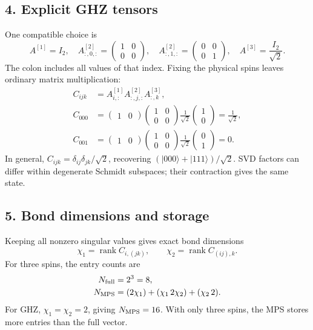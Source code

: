 \documentclass[11pt]{article}
\newcommand{\ket}[1]{\lvert #1\rangle}
\newcommand{\mtwo}[4]{\begin{pmatrix}#1&#2\\#3&#4\end{pmatrix}}
\begin{document}
\subsection*{4. Explicit GHZ tensors}
One compatible choice is
\begin{equation}
A^{[1]}=I_2,\quad
A^{[2]}_{:,0,:}=\mtwo{1}{0}{0}{0},\quad
A^{[2]}_{:,1,:}=\mtwo{0}{0}{0}{1},\quad
A^{[3]}=\frac{I_2}{\sqrt2}.
\end{equation}
The colon includes all values of that index. Fixing the physical spins leaves ordinary matrix multiplication:
\begin{align}
C_{ijk}&=A^{[1]}_{i,:}A^{[2]}_{:,j,:}A^{[3]}_{:,k},\\
C_{000}&=\begin{pmatrix}1&0\end{pmatrix}\mtwo{1}{0}{0}{0}
\frac1{\sqrt2}\begin{pmatrix}1\\0\end{pmatrix}=\frac1{\sqrt2},\\
C_{001}&=\begin{pmatrix}1&0\end{pmatrix}\mtwo{1}{0}{0}{0}
\frac1{\sqrt2}\begin{pmatrix}0\\1\end{pmatrix}=0.
\end{align}
In general, $C_{ijk}=\delta_{ij}\delta_{jk}/\sqrt2$, recovering $(\ket{000}+\ket{111})/\sqrt2$. SVD factors can differ within degenerate Schmidt subspaces; their contraction gives the same state.

\newpage
\subsection*{5. Bond dimensions and storage}
Keeping all nonzero singular values gives exact bond dimensions
\begin{equation}
\chi_1=\operatorname{rank}C_{i,(jk)},\qquad
\chi_2=\operatorname{rank}C_{(ij),k}.
\end{equation}
For three spins, the entry counts are
\begin{align}
N_{\rm full}&=2^3=8,\\
N_{\rm MPS}&=(2\chi_1)+(\chi_1\,2\chi_2)+(\chi_2\,2).
\end{align}
For GHZ, $\chi_1=\chi_2=2$, giving $N_{\rm MPS}=16$. With only three spins, the MPS stores more entries than the full vector.
\end{document}

